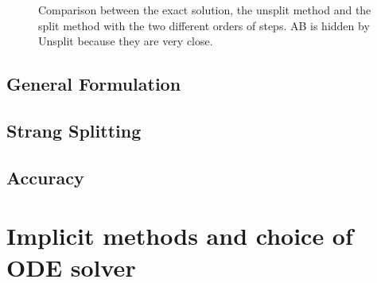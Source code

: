 \documentclass[journal,onecolumn]{IEEEtran}
\begin{document}
\begin{figure}[!ht]
	\centering
	\hfil
	\caption{Comparison between the exact solution, the unsplit method and the split method with the two different orders of steps. AB is hidden by Unsplit because they are very close.}
	\label{fi:AB}
\end{figure}

\subsection{General Formulation}

\subsection{Strang Splitting}

\subsection{Accuracy}























\section{Implicit methods and choice of ODE solver}
\end{document}
